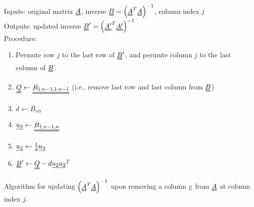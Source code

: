 \documentclass[11pt]{article} %
\begin{document}
\begin{algorithm}
\hrulefill \\
Inputs: original matrix $\uuline{A}$, inverse $\uuline{B} = \left(\uuline{A}^T \uuline{A}\right)^{-1}$, column index $j$\\
Outputs: updated inverse $\uuline{B}' = \left(\uuline{A'}^T \uuline{A'}\right)^{-1}$\\
Procedure:
\begin{enumerate}
\item Permute row $j$ to the last row of $\uuline{B}'$, and permute column $j$ to the last column of $\uuline{B}$.
\item $\uuline{Q} \leftarrow \uuline{B_{1:n-1, 1:n-1}}$ (i.e., remove last row and last column from $\uuline{B}$)
\item $d \leftarrow B_{nn}$
\item $\uline{u_3} \leftarrow\uuline{B_{1:n-1, n}}$
\item $\uline{u_2} \leftarrow \frac{1}{d} \uline{u_3}$
\item $\uuline{B}' \leftarrow \uuline{Q} - d\uline{u_2} \uline{u_2}^T$
\end{enumerate}
\hrulefill
\caption{Algorithm for updating $\left(\uuline{A}^T\uuline{A}\right)^{-1}$ upon removing a column $\uline{v}$ from $\uuline{A}$ at column index $j$.}
\end{algorithm}
\end{document}
